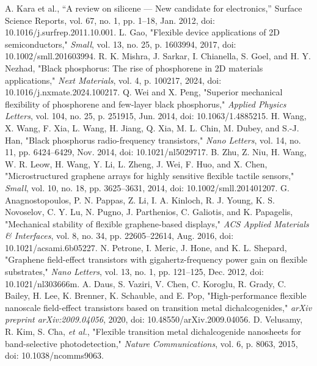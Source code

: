 \documentclass[conference]{IEEEtran}
\begin{document}
\begin{thebibliography}{00}
 A. Kara et al., “A review on silicene — New candidate for electronics,” Surface Science Reports, vol. 67, no. 1, pp. 1–18, Jan. 2012, doi: 10.1016/j.surfrep.2011.10.001.
 L. Gao, "Flexible device applications of 2D semiconductors," \textit{Small}, vol. 13, no. 25, p. 1603994, 2017, doi: 10.1002/smll.201603994.
 R. K. Mishra, J. Sarkar, I. Chianella, S. Goel, and H. Y. Nezhad, "Black phosphorus: The rise of phosphorene in 2D materials applications," \textit{Next Materials}, vol. 4, p. 100217, 2024, doi: 10.1016/j.nxmate.2024.100217.
 Q. Wei and X. Peng, "Superior mechanical flexibility of phosphorene and few-layer black phosphorus," \textit{Applied Physics Letters}, vol. 104, no. 25, p. 251915, Jun. 2014, doi: 10.1063/1.4885215.
 H. Wang, X. Wang, F. Xia, L. Wang, H. Jiang, Q. Xia, M. L. Chin, M. Dubey, and S.-J. Han, "Black phosphorus radio-frequency transistors," \textit{Nano Letters}, vol. 14, no. 11, pp. 6424–6429, Nov. 2014, doi: 10.1021/nl5029717.
 B. Zhu, Z. Niu, H. Wang, W. R. Leow, H. Wang, Y. Li, L. Zheng, J. Wei, F. Huo, and X. Chen, "Microstructured graphene arrays for highly sensitive flexible tactile sensors," \textit{Small}, vol. 10, no. 18, pp. 3625–3631, 2014, doi: 10.1002/smll.201401207.
 G. Anagnostopoulos, P. N. Pappas, Z. Li, I. A. Kinloch, R. J. Young, K. S. Novoselov, C. Y. Lu, N. Pugno, J. Parthenios, C. Galiotis, and K. Papagelis, "Mechanical stability of flexible graphene-based displays," \textit{ACS Applied Materials \& Interfaces}, vol. 8, no. 34, pp. 22605–22614, Aug. 2016, doi: 10.1021/acsami.6b05227.
 N. Petrone, I. Meric, J. Hone, and K. L. Shepard, "Graphene field-effect transistors with gigahertz-frequency power gain on flexible substrates," \textit{Nano Letters}, vol. 13, no. 1, pp. 121–125, Dec. 2012, doi: 10.1021/nl303666m.
 A. Daus, S. Vaziri, V. Chen, C. Koroglu, R. Grady, C. Bailey, H. Lee, K. Brenner, K. Schauble, and E. Pop, "High-performance flexible nanoscale field-effect transistors based on transition metal dichalcogenides," \textit{arXiv preprint arXiv:2009.04056}, 2020, doi: 10.48550/arXiv.2009.04056.
 D. Velusamy, R. Kim, S. Cha, \textit{et al.}, "Flexible transition metal dichalcogenide nanosheets for band-selective photodetection," \textit{Nature Communications}, vol. 6, p. 8063, 2015, doi: 10.1038/ncomms9063.
\end{thebibliography}
\end{document}
